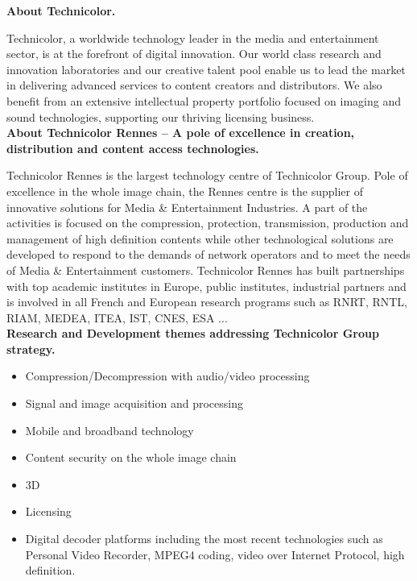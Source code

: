 \newpage
\thispagestyle{empty}

\singlespacing
{\large\bf About Technicolor.\\}

Technicolor, a worldwide technology leader in the media and entertainment sector, is at the forefront of digital innovation. Our world class research and innovation laboratories and our creative talent pool enable us to lead the market in delivering advanced services to content creators and distributors. We also benefit from an extensive intellectual property portfolio focused on imaging and sound technologies, supporting our thriving licensing business. \\

{\large\bf About Technicolor Rennes – A pole of excellence in creation, distribution and content access technologies. \\}

Technicolor Rennes is the largest technology centre of Technicolor Group. Pole of excellence in the whole image chain, the Rennes centre is the supplier of innovative solutions for Media \& Entertainment Industries. A part of the activities is focused on the compression, protection, transmission, production and management of high definition contents while other technological solutions are developed to respond to the demands of network operators and to meet the needs of Media \& Entertainment customers.
Technicolor Rennes has built partnerships with top academic institutes in Europe, public institutes, industrial partners and is involved in all French and European research programs such as RNRT, RNTL, RIAM, MEDEA, ITEA, IST, CNES, ESA ... \\

{\large\bf Research and Development themes addressing Technicolor Group strategy. \\}

\begin{itemize}
  \item Compression/Decompression with audio/video processing
  \item Signal and image acquisition and processing
  \item Mobile and broadband technology
  \item Content security on the whole image chain
  \item 3D
  \item Licensing
  \item Digital decoder platforms including the most recent technologies such as Personal Video Recorder, MPEG4 coding, video over Internet Protocol, high definition. \\
\end{itemize}

